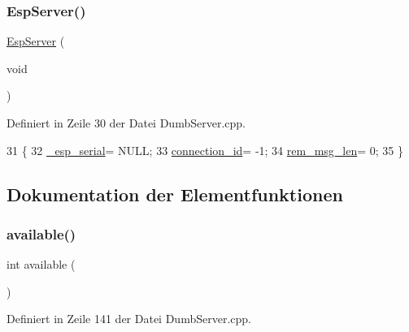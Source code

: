 \subsubsection{\texorpdfstring{Esp\+Server()}{EspServer()}}
{\footnotesize\ttfamily \hyperlink{class_esp_server}{Esp\+Server} (\begin{DoxyParamCaption}\item[{void}]{ }\end{DoxyParamCaption})}



Definiert in Zeile 30 der Datei Dumb\+Server.\+cpp.


\begin{DoxyCode}
31 \{
32   \hyperlink{class_esp_server_a552aab874ad99b696f4c997d6f5a4746}{\_esp\_serial}= NULL;
33   \hyperlink{class_esp_server_a821bd4e05f0b260cc584a2d23bda0fff}{connection\_id}= -1;
34   \hyperlink{class_esp_server_a34a62d83c82a13f441af983f9b212e25}{rem\_msg\_len}= 0;
35 \}
\end{DoxyCode}


\subsection{Dokumentation der Elementfunktionen}
\mbox{\label{class_esp_server_a4549a76725f2e4c013e4d57018366109}} 
\subsubsection{\texorpdfstring{available()}{available()}}
{\footnotesize\ttfamily int available (\begin{DoxyParamCaption}{ }\end{DoxyParamCaption})\hspace{0.3cm}{\ttfamily [virtual]}}



Definiert in Zeile 141 der Datei Dumb\+Server.\+cpp.



